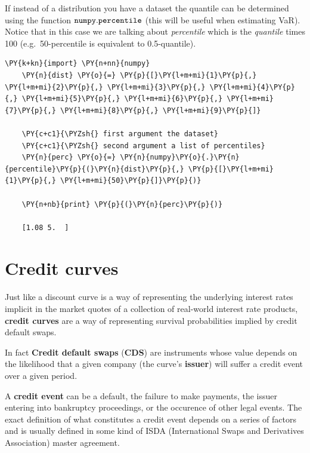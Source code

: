 If instead of a distribution you have a dataset the quantile can be
determined using the function \(\tt{numpy.percentile}\) (this will be
useful when estimating VaR). Notice that in this case we are talking
about \emph{percentile} which is the \emph{quantile} times 100
(e.g.~50-percentile is equivalent to 0.5-quantile).

\begin{tcolorbox}[breakable, size=fbox, boxrule=1pt, pad at break*=1mm,colback=cellbackground, colframe=cellborder]
	\begin{Verbatim}[commandchars=\\\{\}]
	\PY{k+kn}{import} \PY{n+nn}{numpy}
	\PY{n}{dist} \PY{o}{=} \PY{p}{[}\PY{l+m+mi}{1}\PY{p}{,} \PY{l+m+mi}{2}\PY{p}{,} \PY{l+m+mi}{3}\PY{p}{,} \PY{l+m+mi}{4}\PY{p}{,} \PY{l+m+mi}{5}\PY{p}{,} \PY{l+m+mi}{6}\PY{p}{,} \PY{l+m+mi}{7}\PY{p}{,} \PY{l+m+mi}{8}\PY{p}{,} \PY{l+m+mi}{9}\PY{p}{]}
	
	\PY{c+c1}{\PYZsh{} first argument the dataset}
	\PY{c+c1}{\PYZsh{} second argument a list of percentiles}
	\PY{n}{perc} \PY{o}{=} \PY{n}{numpy}\PY{o}{.}\PY{n}{percentile}\PY{p}{(}\PY{n}{dist}\PY{p}{,} \PY{p}{[}\PY{l+m+mi}{1}\PY{p}{,} \PY{l+m+mi}{50}\PY{p}{]}\PY{p}{)}
	
	\PY{n+nb}{print} \PY{p}{(}\PY{n}{perc}\PY{p}{)}
	
	[1.08 5.  ]
	\end{Verbatim}
\end{tcolorbox}

\section{Credit curves}\label{credit-curves}

Just like a discount curve is a way of representing the underlying
interest rates implicit in the market quotes of a collection of
real-world interest rate products, \textbf{credit curves} are a way of
representing survival probabilities implied by credit default swaps.

In fact \textbf{Credit default swaps} (\textbf{CDS}) are instruments whose value
depends on the likelihood that a given company (the curve's
\textbf{issuer}) will suffer a credit event over a given period.

A \textbf{credit event} can be a default, the failure to make payments,
the issuer entering into bankruptcy proceedings, or the occurence of
other legal events. The exact definition of what constitutes a credit
event depends on a series of factors and is usually defined in some kind
of ISDA (International Swaps and Derivatives Association) master
agreement.

